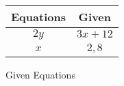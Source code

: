 \begin{tabular}[12pt]{ |c| c|}
    \hline
    \textbf{Equations}& \textbf{Given}\\ 
    \hline
     $2y$ & $3x+12$ \\
    \hline 
     $x$ & $2, 8 $\\
    \hline
    \end{tabular}
    \caption{Given Equations}
